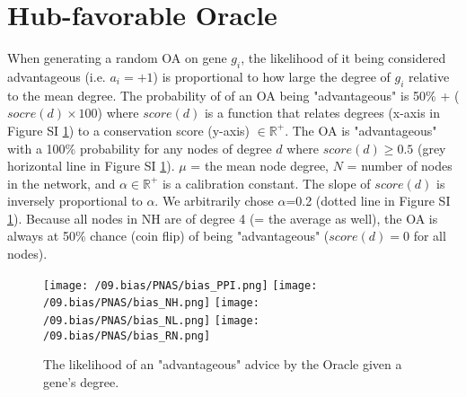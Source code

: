 

\newpage
\section{Hub-favorable Oracle}\label{sup_biased_oracle}
When generating a random OA on gene $g_i$, the likelihood of it being  considered advantageous (i.e. $a_i = +1$) is proportional
to how large the degree of $g_i$ relative to the mean degree.
The probability of of an OA being "advantageous" is 50\% + ($socre(d)\times 100$) where $score(d)$ is a function that relates degrees
(x-axis in Figure SI \ref{supp_bias}) to a conservation score (y-axis) $\in \mathbb{R^+}$.
The OA is "advantageous" with a 100\% probability for any nodes of degree $d$ where $score(d)\geq 0.5$ (grey horizontal line in Figure SI  \ref{supp_bias}).
$\mu$ = the mean node degree, $N$ = number of nodes in the network, and $\alpha\in \mathbb{R^{+}}$ is a calibration constant. The
slope of $score(d)$ is inversely proportional to $\alpha$. We arbitrarily chose $\alpha$=0.2 (dotted line in  Figure SI  \ref{supp_bias}).
Because all nodes in NH are of degree 4 (= the average as well), the OA is always at 50\% chance (coin flip) of being "advantageous" ($score(d)=0$ for
all nodes).

\begin{figure}[H]
		\centering
				\texttt{[image: /09.bias/PNAS/bias\_PPI.png]}
				\texttt{[image: /09.bias/PNAS/bias\_NH.png]}
				\texttt{[image: /09.bias/PNAS/bias\_NL.png]}
				\texttt{[image: /09.bias/PNAS/bias\_RN.png]}
				\caption{The likelihood of an "advantageous" advice by the Oracle given a gene's degree. }
				\label{supp_bias}
\end{figure}
\printbibliography

